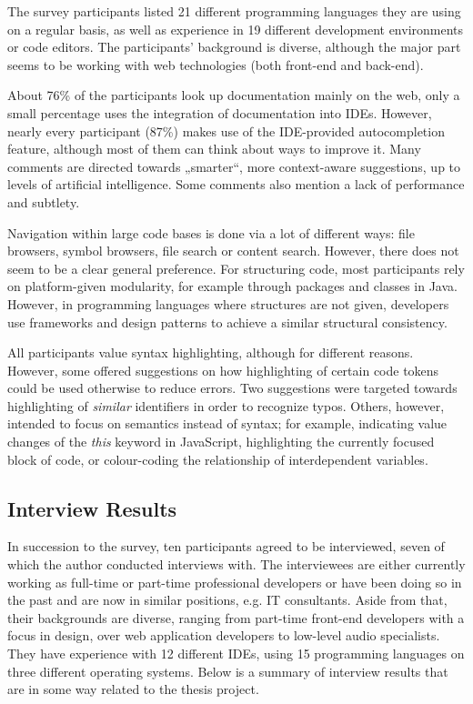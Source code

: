 The survey participants listed 21 different programming languages they
are using on a regular basis, as well as experience in 19 different
development environments or code editors. The participants’ background
is diverse, although the major part seems to be working with web
technologies (both front-end and back-end).

About 76\% of the participants look up documentation mainly on the web,
only a small percentage uses the integration of documentation into IDEs.
However, nearly every participant (87\%) makes use of the IDE-provided
autocompletion feature, although most of them can think about ways to
improve it. Many comments are directed towards „smarter“, more
context-aware suggestions, up to levels of artificial intelligence. Some
comments also mention a lack of performance and subtlety.

Navigation within large code bases is done via a lot of different ways:
file browsers, symbol browsers, file search or content search. However,
there does not seem to be a clear general preference. For structuring
code, most participants rely on platform-given modularity, for example
through packages and classes in Java. However, in programming languages
where structures are not given, developers use frameworks and design
patterns to achieve a similar structural consistency.

All participants value syntax highlighting, although for different
reasons. However, some offered suggestions on how highlighting of
certain code tokens could be used otherwise to reduce errors. Two
suggestions were targeted towards highlighting of \emph{similar}
identifiers in order to recognize typos. Others, however, intended to
focus on semantics instead of syntax; for example, indicating value
changes of the \emph{this} keyword in JavaScript, highlighting the
currently focused block of code, or colour-coding the relationship of
interdependent variables.

\subsection{Interview Results}\label{interview-results}

In succession to the survey, ten participants agreed to be interviewed,
seven of which the author conducted interviews with. The interviewees
are either currently working as full-time or part-time professional
developers or have been doing so in the past and are now in similar
positions, e.g. IT consultants. Aside from that, their backgrounds are
diverse, ranging from part-time front-end developers with a focus in
design, over web application developers to low-level audio specialists.
They have experience with 12 different IDEs, using 15 programming
languages on three different operating systems. Below is a summary of
interview results that are in some way related to the thesis project.


